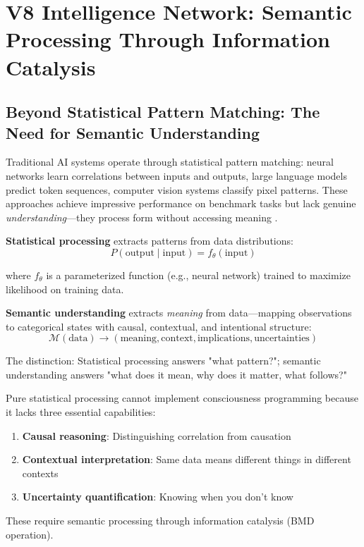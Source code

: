 \section{V8 Intelligence Network: Semantic Processing Through Information Catalysis}

\subsection{Beyond Statistical Pattern Matching: The Need for Semantic Understanding}

Traditional AI systems operate through statistical pattern matching: neural networks learn correlations between inputs and outputs, large language models predict token sequences, computer vision systems classify pixel patterns. These approaches achieve impressive performance on benchmark tasks but lack genuine \textit{understanding}—they process form without accessing meaning \cite{bender2020climbing}.

\begin{definition}
\textbf{Statistical processing} extracts patterns from data distributions:
\begin{equation}
P(\text{output} \mid \text{input}) = f_{\theta}(\text{input})
\end{equation}

where $f_{\theta}$ is a parameterized function (e.g., neural network) trained to maximize likelihood on training data.

\textbf{Semantic understanding} extracts \textit{meaning} from data—mapping observations to categorical states with causal, contextual, and intentional structure:
\begin{equation}
\mathcal{M}(\text{data}) \to (\text{meaning}, \text{context}, \text{implications}, \text{uncertainties})
\end{equation}

The distinction: Statistical processing answers "what pattern?"; semantic understanding answers "what does it mean, why does it matter, what follows?"
\end{definition}

\begin{theorem}
\label{thm:statistical_insufficiency}
Pure statistical processing cannot implement consciousness programming because it lacks three essential capabilities:

\begin{enumerate}
\item \textbf{Causal reasoning}: Distinguishing correlation from causation
\item \textbf{Contextual interpretation}: Same data means different things in different contexts
\item \textbf{Uncertainty quantification}: Knowing when you don't know
\end{enumerate}

These require semantic processing through information catalysis (BMD operation).
\end{theorem}

